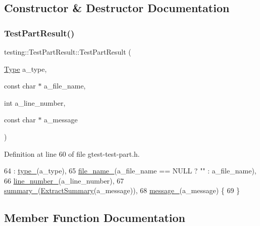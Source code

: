 \subsection{Constructor \& Destructor Documentation}
\mbox{\label{classtesting_1_1TestPartResult_a6409eb519c1cd514aab2426c8f40737f}} 
\subsubsection{\texorpdfstring{Test\+Part\+Result()}{TestPartResult()}}
{\footnotesize\ttfamily testing\+::\+Test\+Part\+Result\+::\+Test\+Part\+Result (\begin{DoxyParamCaption}\item[{\hyperlink{classtesting_1_1TestPartResult_a65ae656b33fdfdfffaf34858778a52d5}{Type}}]{a\+\_\+type,  }\item[{const char $\ast$}]{a\+\_\+file\+\_\+name,  }\item[{int}]{a\+\_\+line\+\_\+number,  }\item[{const char $\ast$}]{a\+\_\+message }\end{DoxyParamCaption})\hspace{0.3cm}{\ttfamily [inline]}}



Definition at line 60 of file gtest-\/test-\/part.\+h.


\begin{DoxyCode}
64       : \hyperlink{classtesting_1_1TestPartResult_a4ee7ac490fe4f10e222fa08c3fa25437}{type\_}(a\_type),
65         \hyperlink{classtesting_1_1TestPartResult_abf5ab5fc171dc6248579a44353385df6}{file\_name\_}(a\_file\_name == NULL ? \textcolor{stringliteral}{""} : a\_file\_name),
66         \hyperlink{classtesting_1_1TestPartResult_a7a988009362bcdc28d3b801fc6059b5e}{line\_number\_}(a\_line\_number),
67         \hyperlink{classtesting_1_1TestPartResult_a6b9bce29122b56a50295710b7f6e345c}{summary\_}(\hyperlink{classtesting_1_1TestPartResult_ac4f4c5383ff6178f441f8bf4ce5ebbff}{ExtractSummary}(a\_message)),
68         \hyperlink{classtesting_1_1TestPartResult_a9adea12d4a4fb4ebf1cd00d22eac9aff}{message\_}(a\_message) \{
69   \}
\end{DoxyCode}


\subsection{Member Function Documentation}
\mbox{\label{classtesting_1_1TestPartResult_ac4f4c5383ff6178f441f8bf4ce5ebbff}} 
